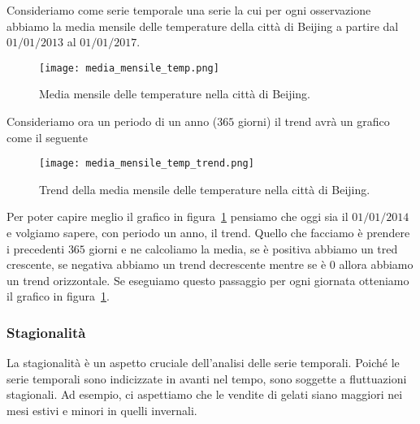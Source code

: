 \begin{esempio} 
    Consideriamo come serie temporale una serie la cui per ogni osservazione abbiamo
    la media mensile delle temperature della città di Beijing a partire 
    dal $01/01/2013$ al $01/01/2017$.

    \begin{figure}[H]
        \centering
        \texttt{[image: media\_mensile\_temp.png]}
        \caption{Media mensile delle temperature nella città di Beijing.}
    \end{figure}

    Consideriamo ora un periodo di un anno ($365$ giorni) il trend avrà un grafico
    come il seguente

    \begin{figure}[H]
        \centering
        \texttt{[image: media\_mensile\_temp\_trend.png]}
        \caption{Trend della media mensile delle temperature nella città di Beijing.}
        \label{fig:media_mensile_temp_trend}
    \end{figure}
    Per poter capire meglio il grafico in figura~\ref*{fig:media_mensile_temp_trend} 
    pensiamo che oggi sia il $01/01/2014$ e volgiamo sapere, con periodo un anno,
    il trend. Quello che facciamo è prendere i precedenti $365$ giorni e ne calcoliamo 
    la media, se è positiva abbiamo un tred crescente, se negativa abbiamo un trend decrescente
    mentre se è $0$ allora abbiamo un trend orizzontale. Se eseguiamo questo passaggio
    per ogni giornata otteniamo il grafico in figura~\ref*{fig:media_mensile_temp_trend}.

\end{esempio}


\subsubsection{Stagionalità}
La stagionalità è un aspetto cruciale dell'analisi delle serie temporali. 
Poiché le serie temporali sono indicizzate in avanti nel tempo, sono soggette a 
fluttuazioni stagionali. Ad esempio, ci aspettiamo che le vendite di gelati siano 
maggiori nei mesi estivi e minori in quelli invernali.

